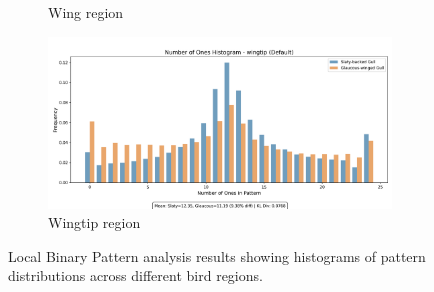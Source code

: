 \documentclass[a4paper,12pt]{report}
\begin{document}
\begin{figure}[H]
\begin{subfigure}[b]{0.32\textwidth}
        \caption{Wing region}
        \label{fig:lbp_wing}
    \end{subfigure}
    \hfill
    \begin{subfigure}[b]{0.32\textwidth}
        \includegraphics[width=\textwidth]{images/appendix/Number_of_Ones_Analysis/default_wingtip_ones_histogram.png}
        \caption{Wingtip region}
        \label{fig:lbp_wingtip}
    \end{subfigure}
    \caption{Local Binary Pattern analysis results showing histograms of pattern distributions across different bird regions.}
    \label{fig:lbp_results}
\end{figure}
\end{document}
